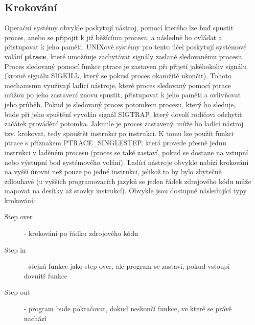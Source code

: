 \documentclass[bc,male,java,dept460]{diploma}						%
\begin{document}
	\subsection{Krokování}
		Operační systémy obvykle poskytují nástroj, pomocí kterého lze buď spustit proces, anebo se připojit k již běžícímu procesu, a následně ho ovládat
		a přistupovat k jeho paměti. UNIXové systémy pro tento účel poskytují systémové volání \textbf{ptrace}\cite{ptrace}, které umožňuje zachytávat signály
		zaslané sledovanému procesu. Proces sledovaný pomocí funkce ptrace je zastaven při přijetí jakéhokoliv signálu (kromě signálu SIGKILL, který se pokusí proces
		okamžitě ukončit). Tohoto mechanismu využívají ladící nástroje, které proces sledovaný pomocí ptrace můžou po jeho zastavení znovu spustit,
		přistupovat k jeho paměti a ovlivňovat jeho průběh. Pokud je sledovaný proces potomkem procesu, který ho sleduje, bude při jeho spuštění vyvolán
		signál SIGTRAP, který dovolí rodičovi odchytit začátek provádění potomka. Jakmile je proces zastavený, může ho ladící nástroj tzv. krokovat, tedy spouštět
		instrukci po instrukci. K tomu lze použít funkci ptrace s příznakem PTRACE\_SINGLESTEP, která provede přesně jednu instrukci v laděném procesu (proces se také
		zastaví, pokud se dostane na vstupní nebo výstupní bod systémového volání)\cite{ptrace}. Ladící nástroje obvykle nabízí krokování na vyšší úrovni než
		pouze po jedné instrukci, jelikož to by bylo zbytečně zdlouhavé (u vyšších programovacích jazyků se jeden řádek zdrojového kódu může mapovat na desítky
		až stovky instrukcí). Obvykle jsou dostupné následující typy krokování:
		\begin{description}
			\item[Step over] - krokování po řádku zdrojového kódu
			\item[Step in] - stejná funkce jako step over, ale program se zastaví, pokud vstoupí dovnitř funkce
			\item[Step out] - program bude pokračovat, dokud neskončí funkce, ve které se právě nachází
		\end{description}
		
\end{document}

